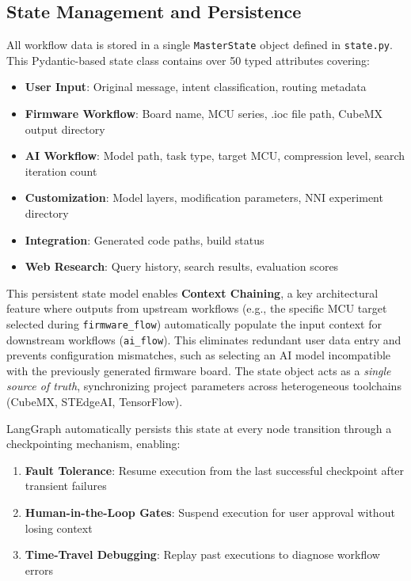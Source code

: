 
\subsection{State Management and Persistence}

All workflow data is stored in a single \texttt{MasterState} object defined in \texttt{state.py}. This Pydantic-based state class contains over 50 typed attributes covering:

\begin{itemize}
    \item \textbf{User Input}: Original message, intent classification, routing metadata
    \item \textbf{Firmware Workflow}: Board name, MCU series, .ioc file path, CubeMX output directory
    \item \textbf{AI Workflow}: Model path, task type, target MCU, compression level, search iteration count
    \item \textbf{Customization}: Model layers, modification parameters, NNI experiment directory
    \item \textbf{Integration}: Generated code paths, build status
    \item \textbf{Web Research}: Query history, search results, evaluation scores
\end{itemize}

This persistent state model enables \textbf{Context Chaining}, a key architectural feature where outputs from upstream workflows (e.g., the specific MCU target selected during \texttt{firmware\_flow}) automatically populate the input context for downstream workflows (\texttt{ai\_flow}). This eliminates redundant user data entry and prevents configuration mismatches, such as selecting an AI model incompatible with the previously generated firmware board. The state object acts as a \textit{single source of truth}, synchronizing project parameters across heterogeneous toolchains (CubeMX, STEdgeAI, TensorFlow).

LangGraph automatically persists this state at every node transition through a checkpointing mechanism, enabling:

\begin{enumerate}
    \item \textbf{Fault Tolerance}: Resume execution from the last successful checkpoint after transient failures
    \item \textbf{Human-in-the-Loop Gates}: Suspend execution for user approval without losing context
    \item \textbf{Time-Travel Debugging}: Replay past executions to diagnose workflow errors
\end{enumerate}

